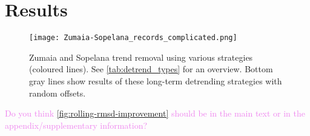 \documentclass[draft]{agujournal2019}
\newcommand{\ijk}{\textcolor{violet}}
\begin{document}


\section{Results}\label{sec:results}

\begin{figure}[htbp]
  \centering
  \texttt{[image: Zumaia-Sopelana\_records\_complicated.png]}
  \caption{\label{fig:detrend}Zumaia and Sopelana trend removal using various
    strategies (coloured lines). See \cref{tab:detrend_types} for an overview.
    Bottom gray lines show results of these long-term detrending strategies
    with random offsets.}
\end{figure}

\ijk{Do you think \cref{fig:rolling-rmsd-improvement} should be in the main
  text or in the appendix/supplementary information?}
\end{document}
